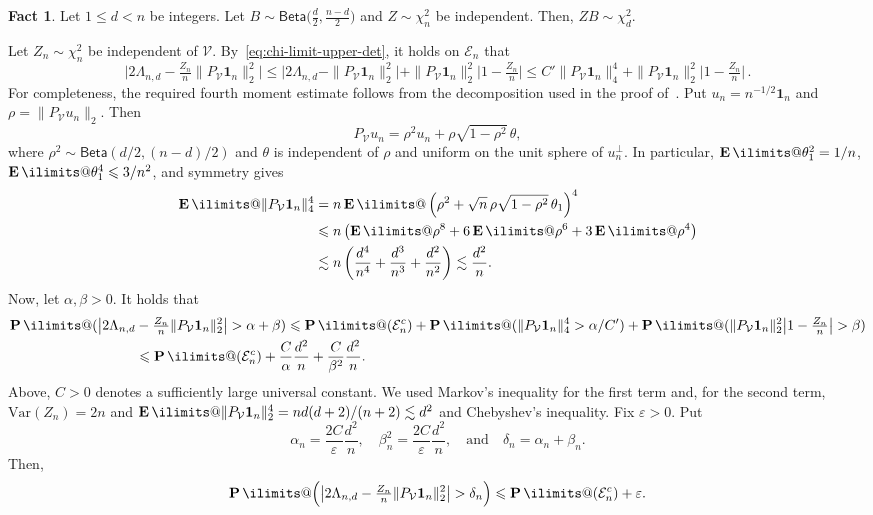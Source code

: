 \documentclass[11pt, letterpaper, hidelinks]{article}
\makeatletter
\newcommand{\cE}{\mathcal{E}}
\newcommand{\cV}{\mathcal{V}}
\newcommand{\1}{\mathbf 1}
\newcommand{\eps}{\varepsilon}
\renewcommand{\leq}{\leqslant}
\newcommand{\Var}{\mathrm{Var}}
\newcommand{\E}{\operatorname*{\mathbf{E}}\ilimits@}
\renewcommand{\P}{\operatorname*{\mathbf{P}}\ilimits@}
\theoremstyle{plain}
\theoremstyle{definition}
\newtheorem{fact}{Fact}[section]
\makeatother
\begin{document}
\begin{fact}
\label{fact:beta-gamma-coupling}
Let $1\leq d<n$ be integers. Let $B \sim \mathsf{Beta}\big(\frac d2,\frac{n-d}{2}\big)$ and $Z\sim \chi^2_n$ be independent. Then, $Z B \sim \chi^2_d$.
\end{fact}

\noindent Let $Z_n \sim \chi^2_n$ be independent of $\cV$. By~\cref{eq:chi-limit-upper-det}, it holds on $\cE_n$ that 
\[
\big|2\Lambda_{n,d} - \tfrac{Z_n}{n} \|P_\cV \1_n\|_2^2\big| 
\leq \Big|2 \Lambda_{n,d} - \|P_\cV \1_n\|_2^2\Big| +  \|P_\cV \1_n\|_2^2 \big|1- \tfrac{Z_n}{n}\big| 
\leq C' \|P_\cV \1_n\|_4^4 +  \|P_\cV \1_n\|_2^2 \big|1- \tfrac{Z_n}{n}\big| \, .
\]
For completeness, the required fourth moment estimate follows from the
decomposition used in the proof of~.
Put $u_n=n^{-1/2}\1_n$ and $\rho=\|P_\cV u_n\|_2$. Then
\[
P_\cV u_n=\rho^2u_n+\rho\sqrt{1-\rho^2}\,\theta,
\]
where $\rho^2\sim\mathsf{Beta}(d/2,(n-d)/2)$ and $\theta$ is independent of
$\rho$ and uniform on the unit sphere of $u_n^\perp$. In particular,
$\E\theta_1^2=1/n$, $\E\theta_1^4\leq3/n^2$, and symmetry gives
\[
\begin{aligned}
\E\|P_\cV\1_n\|_4^4
&=n\E\left(\rho^2+\sqrt n\,\rho\sqrt{1-\rho^2}\,\theta_1\right)^4\\
&\leq n\left(\E\rho^8+6\E\rho^6+3\E\rho^4\right)\\
&\lesssim n\left(\frac{d^4}{n^4}+\frac{d^3}{n^3}+\frac{d^2}{n^2}\right)
\lesssim\frac{d^2}{n}.
\end{aligned}
\]
Now, let $\alpha, \beta > 0$. It holds that 
\begin{align}
\P(\big|2\Lambda_{n,d} &- \tfrac{Z_n}{n} \|P_\cV \1_n\|_2^2\big| > \alpha + \beta) 
\leq \P(\cE_n^c) + \P(\|P_\cV \1_n\|_4^4 > \alpha/C') + \P(\|P_\cV \1_n\|_2^2 \big|1- \tfrac{Z_n}{n}\big| > \beta) \\ 
&\leq \P(\cE_n^c) + \frac{C}{\alpha} \frac{d^2}{n} + \frac{C}{\beta^2} \frac{d^2}{n}.
\end{align} 
Above, $C > 0$ denotes a sufficiently large universal constant. We used Markov's inequality for the first term and, for the second term, $\Var(Z_n) = 2n$ and $\E \|P_\cV \1_n\|_2^4 = n d(d+2)/(n+2) \lesssim d^2$ 
and Chebyshev's inequality. Fix $\eps > 0$. Put 
\[
\alpha_n = \frac{2C}{\eps}\frac{d^2}{n}, 
\quad \beta_n^2 = \frac{2C}{\eps}\frac{d^2}{n}, 
\quad \mbox{and} \quad 
\delta_n = \alpha_n + \beta_n.
\]
Then, 
\begin{equation}\label{ineq:upper-bound-to-chi^2-term-1}
	\P\Big(\big|2\Lambda_{n,d} - \tfrac{Z_n}{n} \|P_\cV \1_n\|_2^2\big| > \delta_n\Big) 
	\leq 
	\P(\cE_n^c) + \eps. 
\end{equation}
\end{document}

